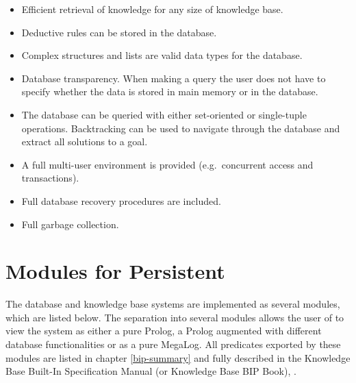 \begin{itemize}
\item  Efficient retrieval of knowledge for any size of 
       knowledge base.
\item  Deductive rules can be stored in the 
       database.
\item  Complex structures and lists are valid data types
       for the database.
\item  Database transparency.  When making a query the user 
       does not have to specify whether the data is stored in 
       main memory or in the database.
\item  The database can be queried with either set-oriented  
       or single-tuple operations.  Backtracking can be used
       to navigate through the database and extract all 
       solutions to a goal.
\item  A full multi-user environment is provided (e.g.\ 
       concurrent access and transactions).
\item  Full database recovery procedures are included.
\item  Full garbage collection.  
\end{itemize}

\newpage

\section{Modules for Persistent \eclipse}

The database and knowledge base systems are implemented as several \eclipse
modules, which are 
listed below. The separation into several modules allows the user
of \eclipse to view the system as either a pure
Prolog, a Prolog augmented with different database functionalities or as a
pure MegaLog. 
All predicates exported by these modules are listed in 
chapter \ref{bip-summary} and fully described in the 
Knowledge Base Built-In Specification Manual (or Knowledge Base BIP Book),
\cite{BIP92}. 


